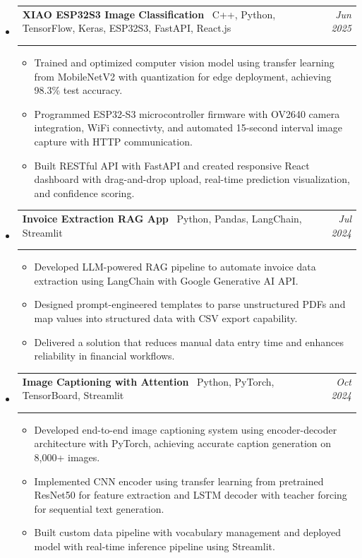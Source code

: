 \documentclass[11pt,a4paper]{article}
\makeatletter
\newcommand{\resumeProjectHeading}[4]{
  \vspace{2pt}
  \item[]
    \begin{tabular*}{\textwidth}[t]{@{\hspace{0pt}}p{0.82\textwidth}@{\extracolsep{\fill}}r}
      \textbf{#1} {\small\textbar\ #2} & \textit{#3} \\
      \if\relax\detokenize{#4}\relax\else
        \multicolumn{2}{l}{\footnotesize\color{gray!70}\faGithub\ \href{#4}{#4}} \\
      \fi
    \end{tabular*}
  \vspace{-8pt}
}
\makeatother
\begin{document}
\begin{itemize}[leftmargin=0pt, label={}]
\resumeProjectHeading
  {XIAO ESP32S3 Image Classification}{C++, Python, TensorFlow, Keras, ESP32S3, FastAPI, React.js}{Jun 2025}{https://github.com/DejusDevspace/seeed-inference-api}
  \begin{itemize}[leftmargin=15pt, label=\textbullet]
    \item Trained and optimized computer vision model using transfer learning from MobileNetV2 with quantization for edge deployment, achieving 98.3\% test accuracy.
    \item Programmed ESP32-S3 microcontroller firmware with OV2640 camera integration, WiFi connectivty, and automated 15-second interval image capture with HTTP communication.
    \item Built RESTful API with FastAPI and created responsive React dashboard with drag-and-drop upload, real-time prediction visualization, and confidence scoring.
  \end{itemize}

\resumeProjectHeading
  {Invoice Extraction RAG App}{Python, Pandas, LangChain, Streamlit}{Jul 2024}{https://github.com/DejusDevspace/Invoice-Extraction-RAG-application}
  \begin{itemize}[leftmargin=15pt, label=\textbullet]
    \item Developed LLM-powered RAG pipeline to automate invoice data extraction using LangChain with Google Generative AI API.
    \item Designed prompt-engineered templates to parse unstructured PDFs and map values into structured data with CSV export capability.
    \item Delivered a solution that reduces manual data entry time and enhances reliability in financial workflows.
  \end{itemize}

\resumeProjectHeading
    {Image Captioning with Attention}{Python, PyTorch, TensorBoard, Streamlit}{Oct 2024}{https://github.com/DejusDevspace/image-captioning}
  \begin{itemize}[leftmargin=15pt, label=\textbullet]
    \item Developed end-to-end image captioning system using encoder-decoder architecture with PyTorch, achieving accurate caption generation on 8,000+ images.
    \item Implemented CNN encoder using transfer learning from pretrained ResNet50 for feature extraction and LSTM decoder with teacher forcing for sequential text generation.
    \item Built custom data pipeline with vocabulary management and deployed model with real-time inference pipeline using Streamlit.
  \end{itemize}


\end{itemize}
\end{document}
